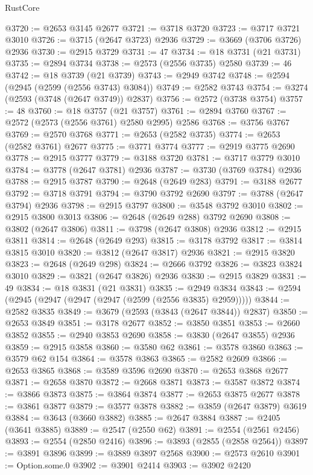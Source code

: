 \begin{lexlean}{RustCore}
\begin{coremodule}
@3720 := @2653 @3145 @2677
@3721 := @3718 @3720
@3723 := @3717 @3721 @3010
@3726 := @3715 (@2647 @3723) @2936
@3729 := @3669 (@3706 @3726) @2936
@3730 := @2915 @3729
@3731 := 47
@3734 := @18 @3731 (@21 @3731)
@3735 := @2894 @3734
@3738 := @2573 (@2556 @3735) @2580
@3739 := 46
@3742 := @18 @3739 (@21 @3739)
@3743 := @2949 @3742
@3748 := @2594 (@2945 (@2599 (@2556 @3743) @3084))
@3749 := @2582 @3743
@3754 := @3274 (@2593 (@3748 (@2647 @3749)) @2837)
@3756 := @2572 (@3738 @3754)
@3757 := 48
@3760 := @18 @3757 (@21 @3757)
@3761 := @2894 @3760
@3767 := @2572 (@2573 (@2556 @3761) @2580 @2995) @2586
@3768 := @3756 @3767
@3769 := @2570 @3768
@3771 := @2653 (@2582 @3735)
@3774 := @2653 (@2582 @3761) @2677
@3775 := @3771 @3774
@3777 := @2919 @3775 @2690
@3778 := @2915 @3777
@3779 := @3188 @3720
@3781 := @3717 @3779 @3010
@3784 := @3778 (@2647 @3781) @2936
@3787 := @3730 (@3769 @3784) @2936
@3788 := @2915 @3787
@3790 := @2648 (@2649 @283)
@3791 := @3188 @2677
@3792 := @3718 @3791
@3794 := @3790 @3792 @2690
@3797 := @3788 (@2647 @3794) @2936
@3798 := @2915 @3797
@3800 := @3548 @3792 @3010
@3802 := @2915 @3800 @3013
@3806 := @2648 (@2649 @288) @3792 @2690
@3808 := @3802 (@2647 @3806)
@3811 := @3798 (@2647 @3808) @2936
@3812 := @2915 @3811
@3814 := @2648 (@2649 @293)
@3815 := @3178 @3792
@3817 := @3814 @3815 @3010
@3820 := @3812 (@2647 @3817) @2936
@3821 := @2915 @3820
@3823 := @2648 (@2649 @298)
@3824 := @2666 @3792
@3826 := @3823 @3824 @3010
@3829 := @3821 (@2647 @3826) @2936
@3830 := @2915 @3829
@3831 := 49
@3834 := @18 @3831 (@21 @3831)
@3835 := @2949 @3834
@3843 := @2594 (@2945 (@2947 (@2947 (@2947 (@2599 (@2556 @3835) @2959)))))
@3844 := @2582 @3835
@3849 := @3679 (@2593 (@3843 (@2647 @3844)) @2837)
@3850 := @2653 @3849
@3851 := @3178 @2677
@3852 := @3850 @3851
@3853 := @2660 @3852
@3855 := @2940 @3853 @2690
@3858 := @3830 (@2647 @3855) @2936
@3859 := @2915 @3858
@3860 := @3580 @62
@3861 := @3578 @3860
@3863 := @3579 @62 @154
@3864 := @3578 @3863
@3865 := @2582 @2609
@3866 := @2653 @3865
@3868 := @3589 @3596 @2690
@3870 := @2653 @3868 @2677
@3871 := @2658 @3870
@3872 := @2668 @3871
@3873 := @3587 @3872
@3874 := @3866 @3873
@3875 := @3864 @3874
@3877 := @2653 @3875 @2677
@3878 := @3861 @3877
@3879 := @3577 @3878
@3882 := @3859 (@2647 @3879) @3619
@3884 := @3643 (@3660 @3882)
@3885 := @2647 @3884
@3887 := @2405 (@3641 @3885)
@3889 := @2547 (@2550 @62)
@3891 := @2554 (@2561 @2456)
@3893 := @2554 (@2850 @2416)
@3896 := @3893 (@2855 (@2858 @2564))
@3897 := @3891 @3896
@3899 := @3889 @3897 @2568
@3900 := @2573 @2610
@3901 := Option.some.{0}
@3902 := @3901 @2414
@3903 := @3902 @2420

\end{coremodule}
\end{lexlean}
